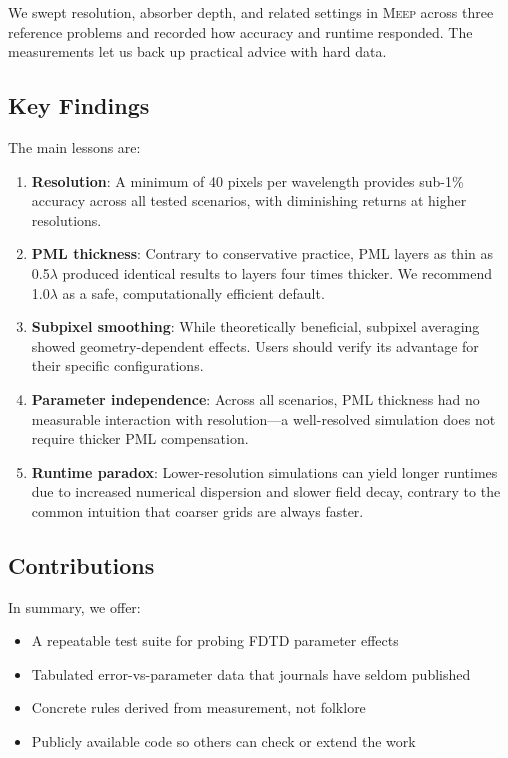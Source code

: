 \documentclass[12pt, a4paper]{article}
\newcommand{\meep}{\textsc{Meep}}
\newcommand{\fdtd}{\textsc{FDTD}}
\begin{document}
We swept resolution, absorber depth, and related settings in \meep{} across three reference problems and recorded how accuracy and runtime responded. The measurements let us back up practical advice with hard data.

\subsection{Key Findings}

The main lessons are:

\begin{enumerate}
    \item \textbf{Resolution}: A minimum of 40 pixels per wavelength provides sub-1\% accuracy across all tested scenarios, with diminishing returns at higher resolutions.
    
    \item \textbf{PML thickness}: Contrary to conservative practice, PML layers as thin as 0.5$\lambda$ produced identical results to layers four times thicker. We recommend 1.0$\lambda$ as a safe, computationally efficient default.
    
    \item \textbf{Subpixel smoothing}: While theoretically beneficial, subpixel averaging showed geometry-dependent effects. Users should verify its advantage for their specific configurations.
    
    \item \textbf{Parameter independence}: Across all scenarios, PML thickness had no measurable interaction with resolution—a well-resolved simulation does not require thicker PML compensation.
    
    \item \textbf{Runtime paradox}: Lower-resolution simulations can yield longer runtimes due to increased numerical dispersion and slower field decay, contrary to the common intuition that coarser grids are always faster.
\end{enumerate}

\subsection{Contributions}

In summary, we offer:
\begin{itemize}
    \item A repeatable test suite for probing \fdtd{} parameter effects
    \item Tabulated error-vs-parameter data that journals have seldom published
    \item Concrete rules derived from measurement, not folklore
    \item Publicly available code so others can check or extend the work
\end{itemize}
\end{document}
